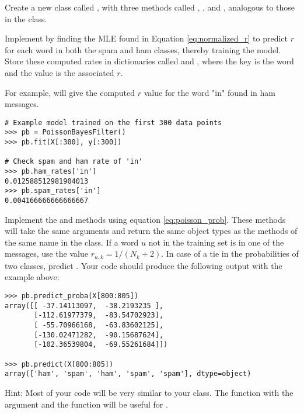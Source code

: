 \begin{problem}
Create a new class called , with three methods called , , and , analogous to those in the  class.

Implement  by finding the MLE found in Equation \ref{eq:normalized_r} to predict $r$ for each word in both the spam and ham classes, thereby training the model.
Store these computed rates in dictionaries called  and , where the key is the word and the value is the associated $r$. 

For example,  will give the computed $r$ value for the word "in" found in ham messages.
\begin{lstlisting}
# Example model trained on the first 300 data points
>>> pb = PoissonBayesFilter()
>>> pb.fit(X[:300], y[:300])

# Check spam and ham rate of 'in'
>>> pb.ham_rates['in']
0.012588512981904013
>>> pb.spam_rates['in']
0.004166666666666667
\end{lstlisting}

Implement the  and  methods using equation \ref{eq:poisson_prob}. 
These methods will take the same arguments and return the same object types as the methods of the same name in the  class.
If a word $u$ not in the training set is in one of the messages, use the value $r_{u,k}=1/(N_{k}+2)$.
In case of a tie in the probabilities of two classes, predict .
Your code should produce the following output with the example above:
\begin{lstlisting}
>>> pb.predict_proba(X[800:805])
array([[ -37.14113097,  -38.2193235 ],
       [-112.61977379,  -83.54702923],
       [ -55.70966168,  -63.83602125],
       [-130.02471282,  -90.15687624],
       [-102.36539804,  -69.55261684]])
       
>>> pb.predict(X[800:805])
array(['ham', 'spam', 'ham', 'spam', 'spam'], dtype=object)
\end{lstlisting}

Hint: Most of your code will be very similar to your  class. The function  with the argument  and the function  will be useful for . 
\end{problem}

